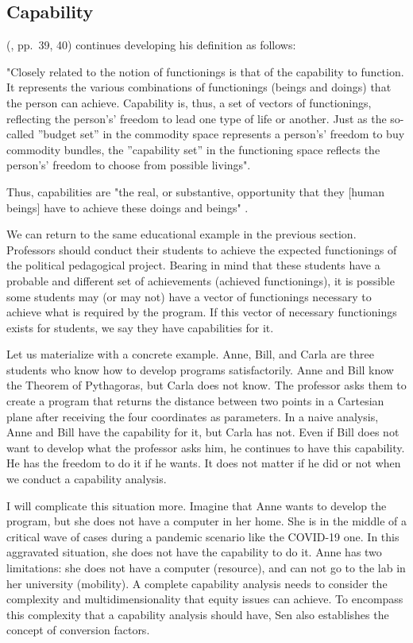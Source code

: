 \subsection{Capability}
\label{sen-ss:capability}

 (\citeyear{sen:1992}, pp.~39, 40) continues developing his definition as follows:
\begin{citacao}
    "Closely related to the notion of functionings is that of the capability to function. It represents the various combinations of functionings (beings and doings) that the person can achieve. Capability is, thus, a set of vectors of functionings, reflecting the person's' freedom to lead one type of life or another. Just as the so-called ''budget set'' in the commodity space represents a person's' freedom to buy commodity bundles, the ''capability set'' in the functioning space reflects the person's' freedom to choose from possible livings".    
\end{citacao}
Thus, capabilities are "the real, or substantive, opportunity that they [human beings] have to achieve these doings and beings" \cite{robeyns:2023}.

We can return to the same educational example in the previous section. Professors should conduct their students to achieve the expected functionings of the political pedagogical project. Bearing in mind that these students have a probable and different set of achievements (achieved functionings), it is possible some students may (or may not) have a vector of functionings necessary to achieve what is required by the program. If this vector of necessary functionings exists for students, we say they have capabilities for it.

Let us materialize with a concrete example. Anne, Bill, and Carla are three students who know how to develop programs satisfactorily. Anne and Bill know the Theorem of Pythagoras, but Carla does not know. The professor asks them to create a program that returns the distance between two points in a Cartesian plane after receiving the four coordinates as parameters. In a naive analysis, Anne and Bill have the capability for it, but Carla has not. Even if Bill does not want to develop what the professor asks him, he continues to have this capability. He has the freedom to do it if he wants. It does not matter if he did or not when we conduct a capability analysis.

I will complicate this situation more. Imagine that Anne wants to develop the program, but she does not have a computer in her home. She is in the middle of a critical wave of cases during a pandemic scenario like the \gls{COVID-19} one. In this aggravated situation, she does not have the capability to do it. Anne has two limitations: she does not have a computer (resource), and can not go to the lab in her university (mobility). A complete capability analysis needs to consider the complexity and multidimensionality that equity issues can achieve. To encompass this complexity that a capability analysis should have, Sen also establishes the concept of conversion factors.


